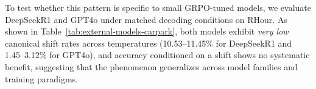 To test whether this pattern is specific to small GRPO-tuned models, we evaluate DeepSeek\textendash R1 and GPT\textendash 4o under matched decoding conditions on RHour. As shown in Table~\ref{tab:external-models-carpark}, both models exhibit \emph{very low} canonical shift rates across temperatures (10.53--11.45\% for DeepSeek\textendash R1 and 1.45--3.12\% for GPT\textendash 4o), and accuracy conditioned on a shift shows no systematic benefit, suggesting that the phenomenon generalizes across model families and training paradigms.
